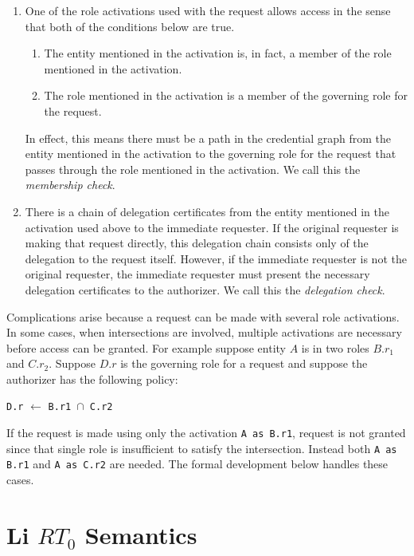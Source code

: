 \documentclass{article}
\newcommand{\newterm}[1]{\textit{#1}}
\newcommand{\memcert}[2]{\texttt{#1} $\leftarrow$ \texttt{#2}}
\newcommand{\activate}[2]{\texttt{#1 as #2}}
\begin{document}
\begin{enumerate}

\item One of the role activations used with the request allows access in the sense that both of
  the conditions below are true.
  \begin{enumerate}
  \item The entity mentioned in the activation is, in fact, a member of the role mentioned in
    the activation.
  \item The role mentioned in the activation is a member of the governing role for the request.
  \end{enumerate}
  In effect, this means there must be a path in the credential graph from the entity mentioned
  in the activation to the governing role for the request that passes through the role mentioned
  in the activation. We call this the \newterm{membership check}.

\item There is a chain of delegation certificates from the entity mentioned in the activation
  used above to the immediate requester. If the original requester is making that request
  directly, this delegation chain consists only of the delegation to the request itself.
  However, if the immediate requester is not the original requester, the immediate requester
  must present the necessary delegation certificates to the authorizer. We call this the
  \newterm{delegation check}.

\end{enumerate}

Complications arise because a request can be made with several role activations. In some cases,
when intersections are involved, multiple activations are necessary before access can be
granted. For example suppose entity $A$ is in two roles $B.r_1$ and $C.r_2$. Suppose $D.r$ is
the governing role for a request and suppose the authorizer has the following policy:

\memcert{D.r}{B.r1 $\cap$ C.r2}

If the request is made using only the activation \activate{A}{B.r1}, request is not granted
since that single role is insufficient to satisfy the intersection. Instead both
\activate{A}{B.r1} and \activate{A}{C.r2} are needed. The formal development below handles these
cases.

\section{Li $RT_0$ Semantics}
\label{sec:RT0-semantics}
\end{document}
